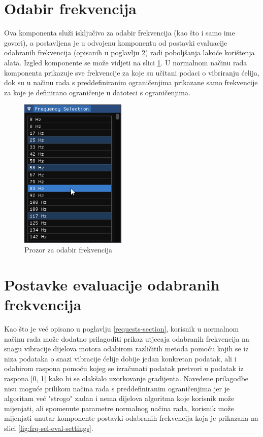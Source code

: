 \documentclass[times, utf8, diplomski]{fer}
\begin{document}
\section{Odabir frekvencija} \label{frequency-selection-section}

Ova komponenta služi isključivo za odabir frekvencija (kao što i samo ime govori), a postavljena je u odvojenu komponentu od postavki evaluacije odabranih frekvencija (opisanih u poglavlju \ref{frequency-settings-section}) radi poboljšanja lakoće korištenja alata. Izgled komponente se može vidjeti na slici \ref{fig:frequency-selection-view}. U normalnom načinu rada komponenta prikazuje sve frekvencije za koje su učitani podaci o vibriranju ćelija, dok su u načinu rada s preddefiniranim ograničenjima prikazane samo frekvencije za koje je definirano ograničenje u datoteci s ograničenjima. 

\begin{figure} [H]
	\centering
    \includegraphics[width=0.45\textwidth]{frequency_selection_view.png}
    \caption{Prozor za odabir frekvencija}
    \label{fig:frequency-selection-view}
\end{figure}

\section{Postavke evaluacije odabranih frekvencija} \label{frequency-settings-section}

Kao što je već opisano u poglavlju \ref{requests-section}, korisnik u normalnom načinu rada može dodatno prilagoditi prikaz utjecaja odabranih frekvencija na snagu vibracije dijelova motora odabirom različitih metoda pomoću kojih se iz niza podataka o snazi vibracije ćelije dobije jedan konkretan podatak, ali i odabirom raspona pomoću kojeg se izračunati podatak pretvori u podatak iz raspona [0, 1] kako bi se olakšalo uzorkovanje gradijenta. Navedene prilagodbe nisu moguće prilikom načina rada s preddefiniranim ograničenjima jer je algoritam već "strogo" zadan i nema dijelova algoritma koje korisnik može mijenjati, ali spomenute parametre normalnog načina rada, korisnik može mijenjati unutar komponente postavki odabranih frekvencija koja je prikazana na slici \ref{fig:frq-sel-eval-settings}.
\end{document}
